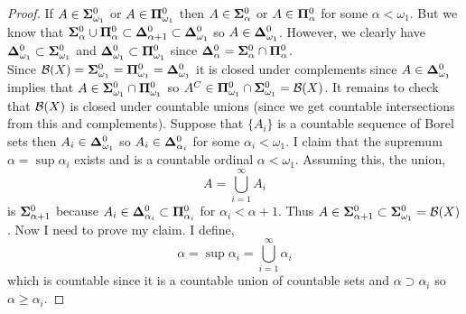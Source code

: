 \documentclass{article}
\theoremstyle{theorem}
\theoremstyle{definition}
\theoremstyle{definition}
\theoremstyle{remark}
\theoremstyle{definition}
\theoremstyle{remark}
\begin{document}
\begin{proof}
If $A \in \mathbf{\Sigma}^0_{\omega_1}$ or $A \in \mathbf{\Pi}^0_{\omega_1}$ then $A \in \mathbf{\Sigma}^0_{\alpha}$ or $A \in \mathbf{\Pi}^0_{\alpha}$ for some $\alpha < \omega_1$. But we know that $\mathbf{\Sigma}^0_{\alpha} \cup \mathbf{\Pi}^0_{\alpha} \subset \mathbf{\Delta}^0_{\alpha+1} \subset \mathbf{\Delta}^0_{\omega_1}$ so $A \in \mathbf{\Delta}^0_{\omega_1}$. However, we clearly have $\mathbf{\Delta}^0_{\omega_1} \subset \mathbf{\Sigma}^0_{\omega_1}$ and $\mathbf{\Delta}^0_{\omega_1} \subset \mathbf{\Pi}^0_{\omega_1}$ since $\mathbf{\Delta}^0_{\alpha} = \mathbf{\Sigma}^0_{\alpha} \cap \mathbf{\Pi}^0_{\alpha}$.  
\bigskip\\
Since $\mathcal{B}(X) = \mathbf{\Sigma}^0_{\omega_1} = \mathbf{\Pi}^0_{\omega_1} = \mathbf{\Delta}^0_{\omega_1}$ it is closed under complements since $A \in \mathbf{\Delta}^0_{\omega_1}$ implies that $A \in \mathbf{\Sigma}^0_{\omega_1} \cap \mathbf{\Pi}^0_{\omega_1}$ so $A^C \in \mathbf{\Pi}^0_{\omega_1} \cap \mathbf{\Sigma}^0_{\omega_1} = \mathcal{B}(X)$. It remains to check that $\mathcal{B}(X)$ is closed under countable unions (since we get countable intersections from this and complements). Suppose that $\{ A_i \}$ is a countable sequence of Borel sets then $A_i \in \mathbf{\Delta}^0_{\omega_1}$ so $A_i \in \mathbf{\Delta}^0_{\alpha_i}$ for some $\alpha_i < \omega_1$. I claim that the supremum $\alpha = \sup{\alpha_i}$ exists and is a countable ordinal $\alpha < \omega_1$. Assuming this, the union,
\[ A = \bigcup_{i = 1}^{\infty} A_i \]
is $\mathbf{\Sigma}^0_{\alpha + 1}$ because $A_i \in \mathbf{\Delta}^0_{\alpha_i} \subset \mathbf{\Pi}^0_{\alpha_i}$ for $\alpha_i < \alpha + 1$. Thus $A \in \mathbf{\Sigma}^0_{\alpha+1} \subset \mathbf{\Sigma}^0_{\omega_1} = \mathcal{B}(X)$. Now I need to prove my claim. I define,
\[ \alpha = \sup{\alpha_i} = \bigcup_{i = 1}^{\infty} \alpha_i \]
which is countable since it is a countable union of countable sets and $\alpha \supset \alpha_i$ so $\alpha \ge \alpha_i$.
\end{proof}
\end{document}
